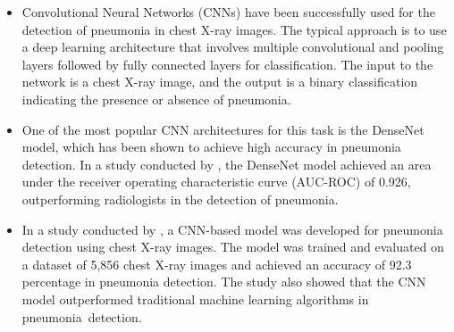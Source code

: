 {
	\begin{itemize}
	\item Convolutional Neural Networks (CNNs) have been successfully used for the detection of pneumonia in chest X-ray images. The typical approach is to use a deep learning architecture that involves multiple convolutional and pooling layers followed by fully connected layers for classification. The input to the network is a chest X-ray image, and the output is a binary classification indicating the presence or absence of pneumonia.
	\item One of the most popular CNN architectures for this task is the DenseNet model, which has been shown to achieve high accuracy in pneumonia detection. In a study conducted by \cite{rajpurkar:2018}, the DenseNet model achieved an area under the receiver operating characteristic curve (AUC-ROC) of 0.926, outperforming radiologists in the detection of pneumonia.\newpage
	
	\item In a study conducted by \cite{Wang:2020}, a CNN-based model was developed for pneumonia detection using chest X-ray images. The model was trained and evaluated on a dataset of 5,856 chest X-ray images and achieved an accuracy of 92.3 percentage in pneumonia detection. The study also showed that the CNN model outperformed traditional machine learning algorithms in pneumonia detection.
		\end{itemize}
}